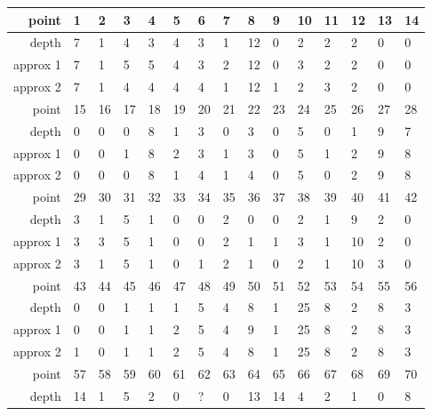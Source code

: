 \begin{center}
  \tablefirsthead{\hline}
  \tablelasttail{\hline}
  \begin{supertabular}{|r|l l l l l l l l l l l l l l|}
    point & 1 & 2 & 3 & 4 & 5 & 6 & 7 & 8 & 9 & 10 & 11 & 12 & 13 & 14 \\
    \hline
depth & 7 & 1 & 4 & 3 & 4 & 3 & 1 & 12 & 0 & 2 & 2 & 2 & 0 & 0 \\
approx 1 & 7 & 1 & 5 & 5 & 4 & 3 & 2 & 12 & 0 & 3 & 2 & 2 & 0 & 0 \\
approx 2 & 7 & 1 & 4 & 4 & 4 & 4 & 1 & 12 & 1 & 2 & 3 & 2 & 0 & 0 \\
\hline
point & 15 & 16 & 17 & 18 & 19 & 20 & 21 & 22 & 23 & 24 & 25 & 26 & 27 & 28 \\
\hline
depth & 0 & 0 & 0 & 8 & 1 & 3 & 0 & 3 & 0 & 5 & 0 & 1 & 9 & 7 \\
approx 1 & 0 & 0 & 1 & 8 & 2 & 3 & 1 & 3 & 0 & 5 & 1 & 2 & 9 & 8 \\
approx 2 & 0 & 0 & 0 & 8 & 1 & 4 & 1 & 4 & 0 & 5 & 0 & 2 & 9 & 8 \\
\hline
point & 29 & 30 & 31 & 32 & 33 & 34 & 35 & 36 & 37 & 38 & 39 & 40 & 41 & 42 \\
\hline
depth & 3 & 1 & 5 & 1 & 0 & 0 & 2 & 0 & 0 & 2 & 1 & 9 & 2 & 0 \\
approx 1 & 3 & 3 & 5 & 1 & 0 & 0 & 2 & 1 & 1 & 3 & 1 & 10 & 2 & 0 \\
approx 2 & 3 & 1 & 5 & 1 & 0 & 1 & 2 & 1 & 0 & 2 & 1 & 10 & 3 & 0 \\
\hline
point & 43 & 44 & 45 & 46 & 47 & 48 & 49 & 50 & 51 & 52 & 53 & 54 & 55 & 56 \\
\hline
depth & 0 & 0 & 1 & 1 & 1 & 5 & 4 & 8 & 1 & 25 & 8 & 2 & 8 & 3 \\
approx 1 & 0 & 0 & 1 & 1 & 2 & 5 & 4 & 9 & 1 & 25 & 8 & 2 & 8 & 3 \\
approx 2 & 1 & 0 & 1 & 1 & 2 & 5 & 4 & 8 & 1 & 25 & 8 & 2 & 8 & 3 \\
\hline
point & 57 & 58 & 59 & 60 & 61 & 62 & 63 & 64 & 65 & 66 & 67 & 68 & 69 & 70 \\
\hline
depth & 14 & 1 & 5 & 2 & 0 & ? & 0 & 13 & 14 & 4 & 2 & 1 & 0 & 8 \\

\end{supertabular}
\end{center}
